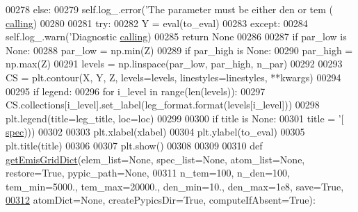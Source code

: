 \begin{DoxyCode}
{{{00278         \textcolor{keywordflow}{else}:
00279             self.log\_.error(\textcolor{stringliteral}{'The parameter must be either den or tem (%
      \hyperlink{classpyneb_1_1core_1_1emis_grid_1_1_emis_grid_a19820878261ee98513e0b755e688453f}{calling})
00280 
00281         \textcolor{keywordflow}{try}:
00282             Y = eval(to\_eval)
00283         \textcolor{keywordflow}{except}:
00284             self.log\_.warn(\textcolor{stringliteral}{'Diagnostic %
      \hyperlink{classpyneb_1_1core_1_1emis_grid_1_1_emis_grid_a19820878261ee98513e0b755e688453f}{calling})            
00285             \textcolor{keywordflow}{return} \textcolor{keywordtype}{None}
00286 
00287         \textcolor{keywordflow}{if} par\_low \textcolor{keywordflow}{is} \textcolor{keywordtype}{None}:
00288             par\_low = np.min(Z)
00289         \textcolor{keywordflow}{if} par\_high \textcolor{keywordflow}{is} \textcolor{keywordtype}{None}:
00290             par\_high = np.max(Z)
00291         levels = np.linspace(par\_low, par\_high, n\_par)
00292 
00293         CS = plt.contour(X, Y, Z, levels=levels, linestyles=linestyles, **kwargs)
00294         
00295         \textcolor{keywordflow}{if} legend:
00296             \textcolor{keywordflow}{for} i\_level \textcolor{keywordflow}{in} range(len(levels)):
00297                 CS.collections[i\_level].set\_label(leg\_format.format(levels[i\_level]))
00298                 plt.legend(title=leg\_title, loc=loc)
00299 
00300         \textcolor{keywordflow}{if} title \textcolor{keywordflow}{is} \textcolor{keywordtype}{None}:
00301             title = \textcolor{stringliteral}{'[%
      \hyperlink{classpyneb_1_1core_1_1emis_grid_1_1_emis_grid_a78618aff86ea296ecefddcc86d98b687}{spec})))
00302 
00303         plt.xlabel(xlabel)
00304         plt.ylabel(to\_eval)
00305         plt.title(title)
00306     
00307         plt.show()
00308         
00309 
00310 \textcolor{keyword}{def }\hyperlink{namespacepyneb_1_1core_1_1emis_grid_a377d90568cd9c52e35ebae2ac9a3c386}{getEmisGridDict}(elem\_list=None, spec\_list=None, atom\_list=None, restore=True, 
      pypic\_path=None,
00311             n\_tem=100, n\_den=100, tem\_min=5000., tem\_max=20000., den\_min=10., den\_max=1e8, save=\textcolor{keyword}{True},
\hypertarget{emis_grid_8py_source_l00312}{}\hyperlink{namespacepyneb_1_1core_1_1emis_grid_a377d90568cd9c52e35ebae2ac9a3c386}{00312}             atomDict=\textcolor{keywordtype}{None}, createPypicsDir=\textcolor{keyword}{True}, computeIfAbsent=\textcolor{keyword}{True}):
}}}}}}
\end{DoxyCode}
